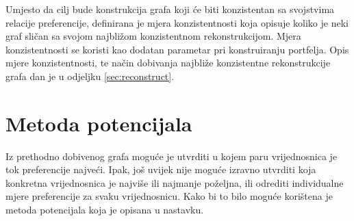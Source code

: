 \documentclass[lmodern, utf8, diplomski, numeric]{fer}
\newcommand{\graph}[1]{\mathcal{#1}}
\begin{document}
  Umjesto da cilj bude konstrukcija grafa koji će biti konzistentan sa svojstvima relacije preferencije, definirana je mjera konzistentnosti koja opisuje koliko je neki graf sličan sa svojom najbližom konzistentnom rekonstrukcijom.
  Mjera konzistentnosti se koristi kao dodatan parametar pri konstruiranju portfelja.
  Opis mjere konzistentnosti, te način dobivanja najbliže konzistentne rekonstrukcije grafa dan je u odjeljku \ref{sec:reconstruct}.
  
  
  

  \section{Metoda potencijala}
  \label{sec:metpot}
  Iz prethodno dobivenog grafa moguće je utvrditi u kojem paru vrijednosnica je tok preferencije najveći.
  Ipak, još uvijek nije moguće izravno utvrditi koja konkretna vrijednosnica je najviše ili najmanje poželjna, ili odrediti individualne mjere preferencije za svaku vrijednosnicu.
  Kako bi to bilo moguće korištena je metoda potencijala\citep{potential} koja je opisana u nastavku.
  
  
\end{document}
